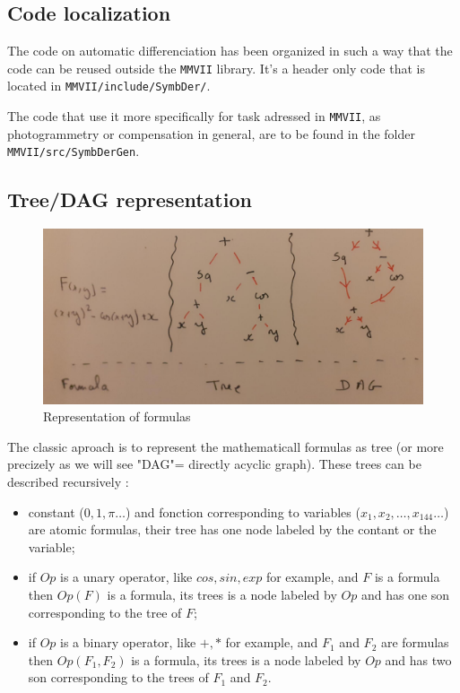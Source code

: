 \subsection{Code localization}

The code on automatic differenciation has been organized in such a way that 
the code can be reused outside the {\tt MMVII} library. It's a header only code
that is located in {\tt MMVII/include/SymbDer/}.


The code that use it more specifically for task adressed in  {\tt MMVII},
as photogrammetry or compensation in general, are to be found in the
folder  {\tt MMVII/src/SymbDerGen}.


\subsection{Tree/DAG representation}

\begin{figure}
\centering
\includegraphics[width=12cm]{Programmer/ImagesProg/Tree.jpg}
\caption{Representation of formulas}
\label{fig:TreeFormula}
\end{figure}

The classic aproach is to represent the mathematicall formulas as tree (or more precizely as we will see "DAG"=  directly acyclic graph).
These trees can be described recursively :

\begin{itemize}
   \item  constant ($0,1,\pi \dots$)  and fonction corresponding to variables ($x_1,x_2,\dots ,x_{144} \dots$)
          are  atomic formulas, their tree has one node labeled by the contant or the variable;

   \item if $Op$ is a unary operator, like $cos, sin, exp $ for example,  and $F$ is a formula then $Op(F)$ is a 
         formula, its trees is a node labeled by $Op$ and has one son corresponding to the tree of $F$;

   \item if $Op$ is a binary operator, like $+,* $ for example,  and $F_1$  and $F_2$ are  formulas then $Op(F_1,F_2)$ is a 
         formula,  its trees is a node labeled by $Op$ and has two son corresponding to the trees of $F_1$ and $F_2$.
\end{itemize}


